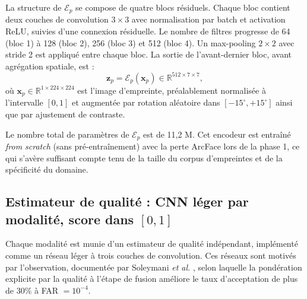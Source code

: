 \documentclass[12pt,a4paper]{report}
\begin{document}
La structure de $\mathcal{E}_p$ se compose de quatre blocs r\'{e}siduels. Chaque bloc contient deux couches de convolution $3 \times 3$ avec normalisation par batch et activation ReLU, suivies d'une connexion r\'{e}siduelle. Le nombre de filtres progresse de 64 (bloc 1) \`{a} 128 (bloc 2), 256 (bloc 3) et 512 (bloc 4). Un max-pooling $2 \times 2$ avec stride 2 est appliqu\'{e} entre chaque bloc. La sortie de l'avant-dernier bloc, avant agr\'{e}gation spatiale, est :
\begin{equation}
\mathbf{z}_p = \mathcal{E}_p(\mathbf{x}_p) \in \mathbb{R}^{512 \times 7 \times 7},
\end{equation}
o\`{u} $\mathbf{x}_p \in \mathbb{R}^{1 \times 224 \times 224}$ est l'image d'empreinte, pr\'{e}alablement normalis\'{e}e \`{a} l'intervalle $[0, 1]$ et augment\'{e}e par rotation al\'{e}atoire dans $[-15^{\circ}, +15^{\circ}]$ ainsi que par ajustement de contraste.

Le nombre total de param\`{e}tres de $\mathcal{E}_p$ est de 11,2 M. Cet encodeur est entra\^{i}n\'{e} \textit{from scratch} (sans pr\'{e}-entra\^{i}nement) avec la perte ArcFace lors de la phase 1, ce qui s'av\`{e}re suffisant compte tenu de la taille du corpus d'empreintes et de la sp\'{e}cificit\'{e} du domaine.

\subsection{Estimateur de qualit\'{e} : CNN l\'{e}ger par modalit\'{e}, score dans $[0,1]$}

Chaque modalit\'{e} est munie d'un estimateur de qualit\'{e} ind\'{e}pendant, impl\'{e}ment\'{e} comme un r\'{e}seau l\'{e}ger \`{a} trois couches de convolution. Ces r\'{e}seaux sont motiv\'{e}s par l'observation, document\'{e}e par Soleymani \emph{et al.} \cite{soleymani2021quality}, selon laquelle la pond\'{e}ration explicite par la qualit\'{e} \`{a} l'\'{e}tape de fusion am\'{e}liore le taux d'acceptation de plus de 30\% \`{a} FAR $= 10^{-4}$.
\end{document}
